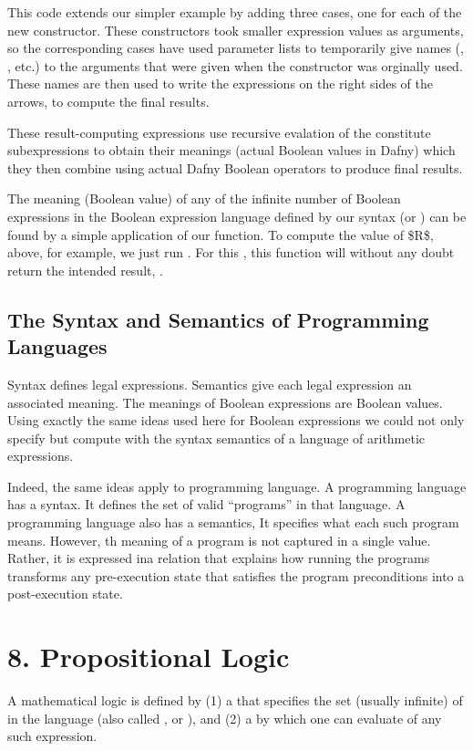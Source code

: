 \documentclass[letterpaper,10pt,english]{sphinxmanual}
\begin{document}
This code extends our simpler example by adding three cases, one for
each of the new constructor. These constructors took smaller
expression values as arguments, so the corresponding cases have used
parameter lists to temporarily give names (, , etc.) to the
arguments that were given when the constructor was orginally used.
These names are then used to write the expressions on the right sides
of the arrows, to compute the final results.

These result-computing expressions use recursive evalation of the
constitute subexpressions to obtain their meanings (actual Boolean
values in Dafny) which they then combine using actual Dafny Boolean
operators to produce final results.

The meaning (Boolean value) of any of the infinite number of Boolean
expressions in the Boolean expression language defined by our syntax
(or ) can be found by a simple application of our 
function. To compute the value of \$R\$, above, for example, we just run
. For this , this function will without any doubt return
the intended result, .


\section{The Syntax and Semantics of Programming Languages}
\label{\detokenize{07-boolean-algebra:the-syntax-and-semantics-of-programming-languages}}
Syntax defines legal expressions. Semantics give each legal expression
an associated meaning. The meanings of Boolean expressions are Boolean
values. Using exactly the same ideas used here for Boolean expressions
we could not only specify but compute with the syntax semantics of a
language of arithmetic expressions.

Indeed, the same ideas apply to programming language. A programming
language has a syntax. It defines the set of valid “programs” in that
language. A programming language also has a semantics, It specifies
what each such program means. However, th meaning of a program is not
captured in a single value. Rather, it is expressed ina relation that
explains how running the programs transforms any pre-execution state
that satisfies the program preconditions into a post-execution state.


\chapter{8. Propositional Logic}
\label{\detokenize{08-propositional-logic:propositional-logic}}\label{\detokenize{08-propositional-logic::doc}}
A mathematical logic is defined by (1) a  that specifies the
set (usually infinite) of  in the language
(also called , or ), and (2) a 
by which one can evaluate  of any such expression.
\end{document}
